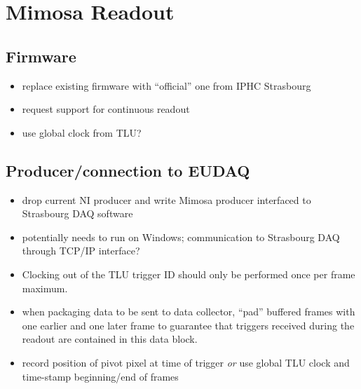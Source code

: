 \documentclass[paper=a4, fontsize=11pt]{scrartcl}	%
\numberwithin{equation}{section}		%
\numberwithin{figure}{section}			%
\numberwithin{table}{section}				%
\begin{document}
\section{Mimosa Readout}

\subsection{Firmware}
\label{sec:firmware}
\begin{itemize}
\item replace existing firmware with ``official'' one from IPHC Strasbourg
\item request support for continuous readout
\item use global clock from TLU?
\end{itemize}

\subsection{Producer/connection to EUDAQ}
\label{sec:prod-eudaq}
\begin{itemize}
\item drop current NI producer and write Mimosa producer interfaced
  to Strasbourg DAQ software
\item potentially needs to run on Windows; communication to Strasbourg
  DAQ through TCP/IP interface?
\item Clocking out of the TLU trigger ID should only be performed once
  per frame maximum.
\item when packaging data to be sent to data collector, ``pad''
  buffered frames with one earlier and one later frame to guarantee
  that triggers received during the readout are contained in this data
  block.
\item record position of pivot pixel at time of trigger \emph{or} use
  global TLU clock and time-stamp beginning/end of frames
\end{itemize}


\end{document}
